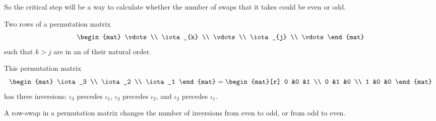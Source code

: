 So the critical step will be a way to calculate whether the 
number of swaps that it takes could be even or odd.

\begin{definition}
Two rows of a permutation matrix
\begin{equation*}
  \begin{mat}
    \vdots          \\
    \iota_{k} \\
    \vdots          \\
    \iota_{j} \\
    \vdots
  \end{mat}
\end{equation*}
such that \( k>j \) are in an %
of their natural order.
\end{definition}

\begin{example}
This permutation matrix
\begin{equation*}
  \begin{mat}
    \iota_3  \\
    \iota_2  \\
    \iota_1
  \end{mat}
  =
  \begin{mat}[r]
    0  &0  &1  \\
    0  &1  &0  \\
    1  &0  &0
  \end{mat}
\end{equation*}
has three inversions: \( \iota_3 \) precedes \( \iota_1 \),
\( \iota_3 \) precedes \( \iota_2 \), and \( \iota_2 \) precedes
\( \iota_1 \).
\end{example}

\begin{lemma} \label{le:SwapsChangeSgn}
A row-swap in a permutation matrix changes the number of 
inversions from even to odd, or from odd to even.
\end{lemma}

